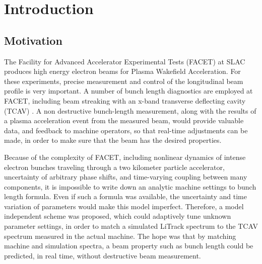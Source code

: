 \documentclass[%
twocolumn,
showpacs,preprintnumbers,
 aps,
prstab,
]{revtex4-1}
\begin{document}

\maketitle







\section{Introduction}

\subsection{Motivation}

The Facility for Advanced Accelerator Experimental Tests (FACET) at SLAC produces high energy electron beams for Plasma Wakefield Acceleration. For these experiments, precise measurement and control of the longitudinal beam profile is very important. A number of bunch length diagnostics are employed at FACET, including beam streaking with an x-band transverse deflecting cavity (TCAV) \cite{ref-FACET}. A non destructive bunch-length measurement, along with the results of a plasma acceleration event from the measured beam, would provide valuable data, and feedback to machine operators, so that real-time adjustments can be made, in order to make sure that the beam has the desired properties.

Because of the complexity of FACET, including nonlinear dynamics of intense electron bunches traveling through a two kilometer particle accelerator, uncertainty of arbitrary phase shifts, and time-varying coupling between many components, it is impossible to write down an analytic machine settings to bunch length formula. Even if such a formula was available, the uncertainty and time variation of parameters would make this model imperfect. Therefore, a model independent scheme was proposed, which could adaptively tune unknown parameter settings, in order to match a simulated LiTrack spectrum to the TCAV spectrum measured in the actual machine. The hope was that by matching machine and simulation spectra, a beam property such as bunch length could be predicted, in real time, without destructive beam measurement.
\end{document}
